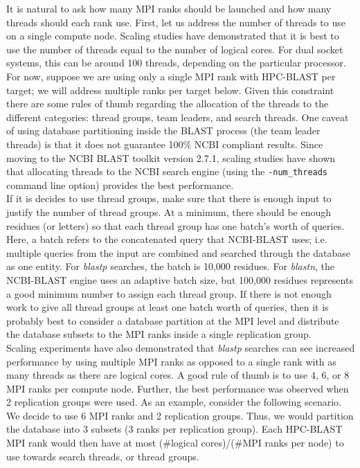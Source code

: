 \documentclass[10pt]{article}
\begin{document}
It is natural to ask how many MPI ranks should be launched and how many threads should each rank use.  First, let us address the number of threads to use
on a single compute node.  Scaling studies have demonstrated that it is best to use
the number of threads equal to the number of logical cores.  For dual socket systems, this can be around 100 threads, depending on the particular processor.
For now, suppose we are using only a single MPI rank with HPC-BLAST per target; we will address multiple ranks per target below.
Given this constraint there are some rules of thumb regarding the allocation of the threads to the different categories: thread groups, team leaders, and search threads.
One caveat of using database partitioning inside the BLAST process (the team leader threads) is that it does not guarantee 100\% NCBI compliant results.  
Since moving to the NCBI BLAST toolkit version 2.7.1, scaling studies have shown that allocating threads to the NCBI search engine (using the \verb^-num_threads^ command line option)
provides the best performance.\\

If it is decides to use thread groups, make sure that there is enough input to justify the number of thread groups.
At a minimum, there should be enough residues (or letters) so that each thread group has one batch's worth of queries.  Here, a batch refers to the concatenated
query that NCBI-BLAST uses; i.e. multiple queries from the input are combined and searched through the database as one entity.  For \emph{blastp} searches, the batch
is 10,000 residues.  For \emph{blastn}, the NCBI-BLAST engine uses an adaptive batch size, but 100,000 residues represents a good minimum number to assign each
thread group.  If there is not enough work to give all thread groups at least one batch worth of queries, then it is probably best to consider a database partition at the MPI
level and distribute the database subsets to the MPI ranks inside a single replication group.\\

Scaling experiments have also demonstrated that \emph{blastp} searches can see increased performance by
using multiple MPI ranks as opposed to a single rank with as many threads as there are logical cores.  A good rule of thumb is to use 4, 6, or 8
MPI ranks per compute node.  Further, the best performance was observed when 2 replication groups were used.  As an example, consider the following scenario.  We decide
to use 6 MPI ranks and 2 replication groups.  Thus, we would partition the database into 3 subsets (3 ranks per replication group).  Each HPC-BLAST MPI rank would then have
at most (\#logical cores)/(\#MPI ranks per node) to use towards search threads, or thread groups.\\
\end{document}
